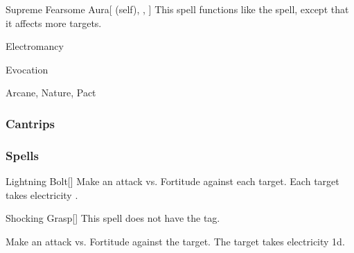 \lowercase{\hypertarget{spell:Supreme Fearsome Aura}{}}\label{spell:Supreme Fearsome Aura}
\begin{attuneability}[\nth{6}]{\hypertarget{spell:Supreme Fearsome Aura}{Supreme Fearsome Aura}}[ (self), , ]
This spell functions like the  spell, except that it affects more targets.
\end{attuneability}
\vspace{0.25em}


\newpage
\begin{spellsection}{Electromancy}

\begin{spellheader}
\end{spellheader}


 Evocation

 Arcane, Nature, Pact

\subsubsection{Cantrips}


\end{spellsection}


\subsubsection{Spells}


\lowercase{\hypertarget{spell:Lightning Bolt}{}}\label{spell:Lightning Bolt}
\begin{freeability}[\nth{1}]{\hypertarget{spell:Lightning Bolt}{Lightning Bolt}}[]
Make an attack vs. Fortitude against each target.
\hit Each target takes electricity .
\end{freeability}
\vspace{0.25em}



\lowercase{\hypertarget{spell:Shocking Grasp}{}}\label{spell:Shocking Grasp}
\begin{freeability}[\nth{1}]{\hypertarget{spell:Shocking Grasp}{Shocking Grasp}}[]
This spell does not have the  tag.

Make an attack vs. Fortitude against the target.
\hit The target takes electricity  \plus1d.
\end{freeability}
\vspace{0.25em}



